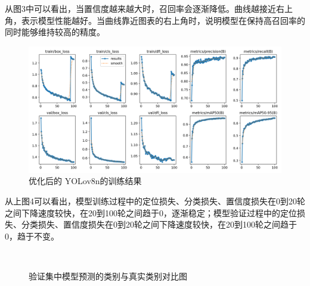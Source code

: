 \documentclass[journal]{IEEEtran}
\numberwithin{figure}{section}%
\numberwithin{table}{section}%
\numberwithin{equation}{section}
\begin{document}
从图3中可以看出，当置信度越来越大时，召回率会逐渐降低。曲线越接近右上角，表示模型性能越好。当曲线靠近图表的右上角时，说明模型在保持高召回率的同时能够维持较高的精度。\par

\begin{figure}
	\centering
	\includegraphics[scale=0.6]{./figures/5_6.png}
	\caption{优化后的 YOLov8n的训练结果}
	\label{fig:13}
\end{figure}
从上图4可以看出，模型训练过程中的定位损失、分类损失、置信度损失在0到20轮之间下降速度较快，在20到100轮之间趋于0，逐渐稳定；模型验证过程中的定位损失、分类损失、置信度损失在0到20轮之间下降速度较快，在20到100轮之间趋于0，趋于不变。\par

\begin{figure}[H]
	\centering
	\\
	\caption{验证集中模型预测的类别与真实类别对比图}
	\label{fig10}
\end{figure}
\end{document}
